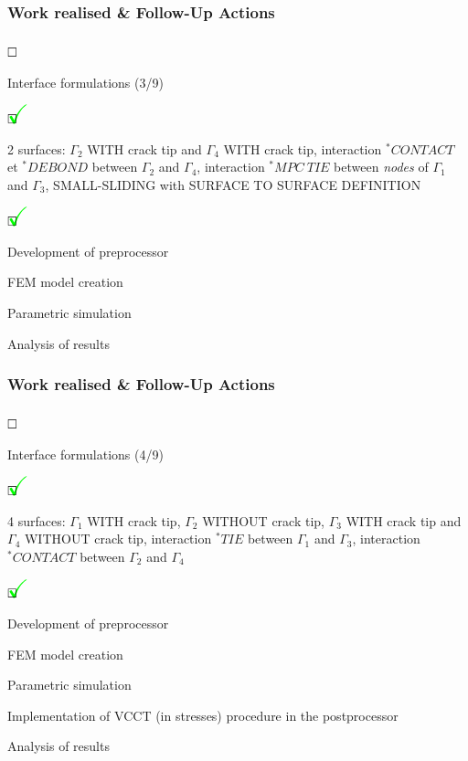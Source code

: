 \documentclass[first,firstsupp,lastsupp,handout,last,hyperref,table]{ETHclass}
\begin{document}
\begin{frame}
\frametitle{Work realised \& Follow-Up Actions}
\vspace{-0.5cm}
\scriptsize
\begin{list}{$\text{\rlap{\textcolor{white}{\huge$\mathbf{\checkmark}$}}}\square$}{}  
\item Interface formulations (3/9)
\begin{list}{$\text{\rlap{\textcolor{green}{\huge$\mathbf{\checkmark}$}}}\square$}{}  
\item 2 surfaces: $\Gamma_{2}$ WITH crack tip and $\Gamma_{4}$ WITH crack tip, interaction $^{*}CONTACT$ et $^{*}DEBOND$ between  $\Gamma_{2}$ and $\Gamma_{4}$, interaction $^{*}MPC\ TIE$ between \textit{nodes} of $\Gamma_{1}$ and $\Gamma_{3}$, SMALL-SLIDING with SURFACE TO SURFACE DEFINITION
\begin{list}{$\text{\rlap{\textcolor{green}{\huge$\mathbf{\checkmark}$}}}\square$}{}
\item Development of preprocessor
\item FEM model creation
\item Parametric simulation
\item Analysis of results
\end{list}
\end{list}
\end{list}
\end{frame}

\begin{frame}
\frametitle{Work realised \& Follow-Up Actions}
\vspace{-0.5cm}
\scriptsize
\begin{list}{$\text{\rlap{\textcolor{white}{\huge$\mathbf{\checkmark}$}}}\square$}{}  
\item Interface formulations (4/9)
\begin{list}{$\text{\rlap{\textcolor{green}{\huge$\mathbf{\checkmark}$}}}\square$}{}  
\item  4 surfaces: $\Gamma_{1}$ WITH crack tip, $\Gamma_{2}$ WITHOUT crack tip, $\Gamma_{3}$ WITH crack tip and $\Gamma_{4}$ WITHOUT crack tip, interaction $^{*}TIE$ between  $\Gamma_{1}$ and $\Gamma_{3}$, interaction $^{*}CONTACT$ between  $\Gamma_{2}$ and $\Gamma_{4}$
\begin{list}{$\text{\rlap{\textcolor{green}{\huge$\mathbf{\checkmark}$}}}\square$}{}
\item Development of preprocessor
\item FEM model creation
\item Parametric simulation
\item Implementation of VCCT (in stresses) procedure in the postprocessor
\item Analysis of results
\end{list}
\end{list}
\end{list}
\end{frame}
\end{document}
